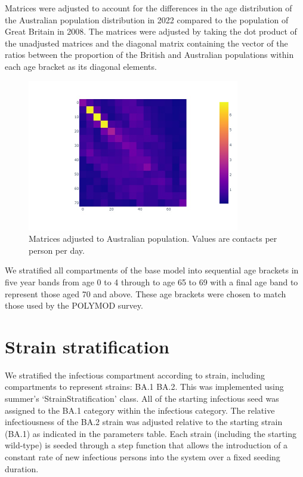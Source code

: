 \documentclass{article}%
\begin{document}
%
Matrices were adjusted to account for the differences in the age distribution of the Australian population distribution in 2022 compared to the population of Great Britain in 2008. The matrices were adjusted by taking the dot product of the unadjusted matrices and the diagonal matrix containing the vector of the ratios between the proportion of the British and Australian populations within each age bracket as its diagonal elements. %


\begin{figure}%
\centering%
\includegraphics[width=350px]{adjusted_matrix.jpg}%
\caption{Matrices adjusted to Australian population. Values are contacts per person per day.}%
\end{figure}

%
We stratified all compartments of the base model into sequential age brackets in five year bands from age 0 to 4 through to age 65 to 69 with a final age band to represent those aged 70 and above. These age brackets were chosen to match those used by the POLYMOD survey. 

%
\section{Strain stratification}%
\label{sec:Strainstratification}%
We stratified the infectious compartment according to strain, including compartments to represent strains: BA.1 BA.2. This was implemented using summer's `StrainStratification' class. All of the starting infectious seed was assigned to the BA.1 category within the infectious category. %
The relative infectiousness of the BA.2 strain was adjusted relative to the starting strain (BA.1) as indicated in the parameters table. %
Each strain (including the starting wild{-}type) is seeded through a step function that allows the introduction of a constant rate of new infectious persons into the system over a fixed seeding duration. 
\end{document}
